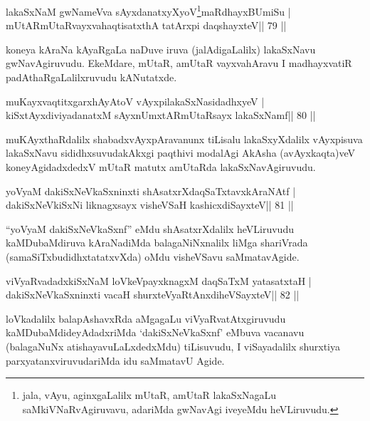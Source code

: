 \begin{shl}
lakaSxNaM gwNameVva sAyxdanatxyXyoV\footnote{jala, vAyu, aginxgaLalilx mUtaR, amUtaR lakaSxNagaLu saMkiVNaRvAgiruvavu, adariMda gwNavAgi iveyeMdu heVLiruvudu.}maRdhayxBUmiSu |
mUtARmUtaRvayxvahaqtisatxthA tatArxpi daqshayxteV\hfill || 79 ||
\end{shl}

\begin{artha}
koneya kAraNa kAyaRgaLa naDuve iruva (jalAdigaLalilx) lakaSxNavu gwNavAgiruvudu. EkeMdare, mUtaR, amUtaR vayxvahAravu I madhayxvatiR padAthaRgaLalilxruvudu kANutatxde.
\end{artha}


\begin{shl}
muKayxvaqtitxgarxhAyAtoV vAyxpilakaSxNasidadhxyeV |
kiSxtAyxdiviyadanatxM sAyxnUmxtARmUtaRsayx lakaSxNamf\hfill || 80 ||
\end{shl}

\begin{artha}
muKAyxthaRdalilx shabadxvAyxpAravanunx tiLisalu lakaSxyXdalilx vAyxpisuva lakaSxNavu sididhxsuvudakAkxgi paqthivi modalAgi AkAsha (avAyxkaqta)veV koneyAgidadxdedxV mUtaR matutx amUtaRda lakaSxNavAgiruvudu.
\end{artha}



\begin{shl}
yoV\s yaM dakiSxNeV\s kaSxninxti shAsatxrXdaqSaTxtavxkAraNAtf |
dakiSxNeV\s kiSxNi liknagxsayx visheVSaH kashicxdiSayxteV\hfill || 81 ||
\end{shl}

\begin{artha}
``yoV\s yaM dakiSxNeV\s kaSxnf'' eMdu shAsatxrXdalilx heVLiruvudu kaMDubaMdiruva kAraNadiMda balagaNiNxnalilx liMga shariVrada (samaSiTxbudidhxtatatxvXda) oMdu visheVSavu saMmatavAgide.
\end{artha}



\begin{shl}
viVyaRvadadxkiSxNaM loVkeV\s payxknagxM daqSaTxM yatasatxtaH |
dakiSxNeV\s kaSxninxti vacaH shurxteVyaRtAnxdiheVSayxteV\hfill || 82 ||
\end{shl}

\begin{artha}
loVkadalilx balapAshavxRda aMgagaLu viVyaRvatAtxgiruvudu kaMDubaMdideyAdadxriMda `dakiSxNeV\s kaSxnf' eMbuva vacanavu (balagaNuNx atishayavuLaLxdedxMdu) tiLisuvudu, I viSayadalilx shurxtiya parxyatanxviruvudariMda idu saMmatavU Agide.
\end{artha}

